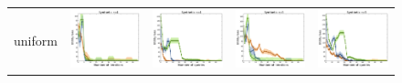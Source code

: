 \documentclass{article}
\renewcommand\[{\begin{equation}}
\renewcommand\]{\end{equation}}
\newcommand{\stefano}[1]{{\bf \textcolor{green}{{\fbox{Stefano:} #1}}}}
\begin{document}


\begin{figure}[t]
    \centering
    {\footnotesize
    \begin{tabular}{ccccc}
        {\sc uniform} &
        \includegraphics[align=c,width=10em]{figures/synthetic_vs_self_4_uniform_per_iter_loss} &
        \includegraphics[align=c,width=10em]{figures/synthetic_vs_self_4_uniform_per_query_loss} &
        \includegraphics[align=c,width=10em]{figures/synthetic_vs_self_5_uniform_per_iter_loss} &
        \includegraphics[align=c,width=10em]{figures/synthetic_vs_self_5_uniform_per_query_loss}
        \\

\end{tabular}}
\end{figure}
\end{document}
